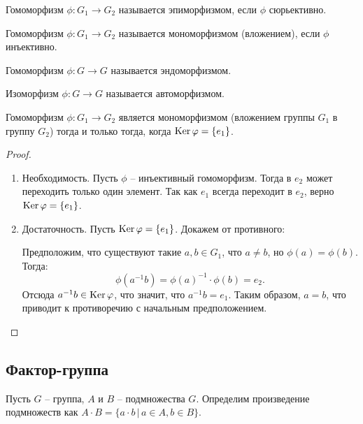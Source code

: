 \begin{definition}
    Гомоморфизм $\phi: G_1 \to G_2$ называется эпиморфизмом, если $\phi$ сюрьективно.
\end{definition}

\begin{definition}
    Гомоморфизм $\phi: G_1 \to G_2$ называется мономорфизмом (вложением), если $\phi$ инъективно.
\end{definition}

\begin{definition}
    Гомоморфизм $\phi: G \to G$ называется эндоморфизмом.
\end{definition}

\begin{definition}
    Изоморфизм $\phi: G \to G$ называется автоморфизмом.
\end{definition}

\begin{proposition}
    Гомоморфизм $\phi: G_1 \to G_2$ является мономорфизмом (вложением группы $G_1$ в группу $G_2$) 
    тогда и только тогда, когда $\operatorname{Ker} \varphi = \{e_1\}$.
\end{proposition}

\begin{proof}~
    \begin{enumerate}
        \item Необходимость. Пусть $\phi$ -- инъективный гомоморфизм. Тогда в $e_2$ может переходить 
        только один элемент. Так как $e_1$ всегда переходит в $e_2$, верно $\operatorname{Ker} \varphi = \{e_1\}$.
        \item Достаточность. Пусть $\operatorname{Ker} \varphi = \{e_1\}$. Докажем от противного:
        
        Предположим, что существуют такие $a, b \in G_1$, 
        что $a \neq b$, но $\phi(a) = \phi(b)$. Тогда: 
        $$\phi(a^{-1}b) = \phi(a)^{-1} \cdot \phi(b) = e_2.$$
        Отсюда $a^{-1}b \in \operatorname{Ker} \varphi$, что значит, что $a^{-1}b = e_1$. Таким образом, $a = b$, что 
        приводит к противоречию с начальным предположением.
    \end{enumerate}
\end{proof}

\subsection{Фактор-группа}

\begin{definition}
    Пусть $G$ -- группа, $A$ и $B$ -- подмножества $G$. Определим произведение подмножеств 
    как $A \cdot B = \{a\cdot b \,|\, a \in A, b \in B\}$.
\end{definition}

